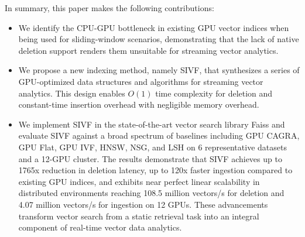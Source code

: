 \documentclass[sigconf,nonacm]{acmart}
\theoremstyle{plain}
\theoremstyle{definition}
\theoremstyle{remark}
\begin{document}
In summary, this paper makes the following contributions:
\begin{itemize}
    \item We identify the CPU-GPU bottleneck in existing GPU vector indices when being used for sliding-window scenarios, demonstrating that the lack of native deletion support renders them unsuitable for streaming vector analytics.
    
    \item We propose a new indexing method, namely SIVF, that synthesizes a series of GPU-optimized data structures and algorithms for streaming vector analytics. This design enables $O(1)$ time complexity for deletion and constant-time insertion overhead with negligible memory overhead.
    
    \item We implement SIVF in the state-of-the-art vector search library Faiss and evaluate SIVF against a broad spectrum of baselines including GPU CAGRA, GPU Flat, GPU IVF, HNSW, NSG, and LSH on 6 representative datasets and a 12-GPU cluster. The results demonstrate that SIVF achieves up to 1765x reduction in deletion latency, up to 120x faster ingestion compared to existing GPU indices, and exhibits near perfect linear scalability in distributed environments reaching 108.5 million vectors/s for deletion and 4.07 million vectors/s for ingestion on 12 GPUs. These advancements transform vector search from a static retrieval task into an integral component of real-time vector data analytics.
\end{itemize}

\end{document}
